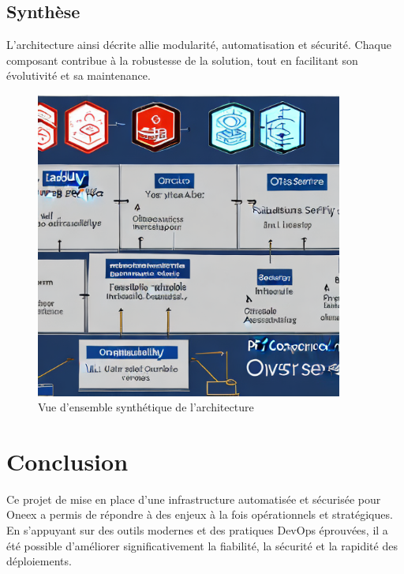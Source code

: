 \subsection*{Synthèse}

L’architecture ainsi décrite allie modularité, automatisation et sécurité. Chaque composant contribue à la robustesse de la solution, tout en facilitant son évolutivité et sa maintenance.

\begin{figure}[H]
	\centering
	\includegraphics[width=0.9\textwidth]{figures/synthese-architecture.png}
	\caption{Vue d’ensemble synthétique de l’architecture}
\end{figure}

\section{Conclusion}

Ce projet de mise en place d'une infrastructure automatisée et sécurisée pour Oneex a permis de répondre à des enjeux à la fois opérationnels et stratégiques. En s’appuyant sur des outils modernes et des pratiques DevOps éprouvées, il a été possible d’améliorer significativement la fiabilité, la sécurité et la rapidité des déploiements.

